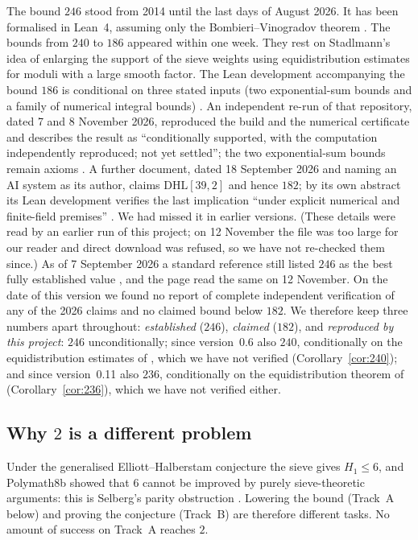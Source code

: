 \documentclass[11pt]{amsart}
\theoremstyle{definition}
\theoremstyle{remark}
\newcommand{\DHL}{\mathrm{DHL}}
\begin{document}
The bound $246$ stood from 2014 until the last days of August 2026. It has been
formalised in Lean~4, assuming only the Bombieri--Vinogradov theorem
\cite{Axiom26}. The bounds from $240$ to $186$ appeared within one week.
They rest on Stadlmann's idea of enlarging the support of the sieve weights
using equidistribution estimates for moduli with a large smooth factor. The
Lean development accompanying the bound $186$ is conditional on three stated
inputs (two exponential-sum bounds and a family of numerical integral bounds)
\cite{OAI26}. An independent re-run of that repository, dated 7 and 8 November
2026, reproduced the build and the numerical certificate and describes the
result as ``conditionally supported, with the computation independently
reproduced; not yet settled''; the two exponential-sum bounds remain axioms
\cite{NM26}. A further document, dated 18 September 2026 and naming an AI
system as its author, claims $\DHL[39,2]$ and hence $182$; by its own abstract
its Lean development verifies the last implication ``under explicit numerical
and finite-field premises'' \cite{Sha26}. We had missed it in earlier
versions. (These details were read by an earlier run of this project; on
12 November the file was too large for our reader and direct download was
refused, so we have not re-checked them since.) As of 7 September 2026 a standard reference still listed $246$ as
the best fully established value \cite{MW}, and the page read the same on 12
November. On the date of this version we found no report of complete
independent verification of any of the 2026 claims and no claimed bound below
$182$. We therefore keep three numbers apart throughout: \emph{established}
($246$), \emph{claimed} ($182$), and \emph{reproduced by this project}:
$246$ unconditionally; since version~0.6 also $240$, conditionally on
the equidistribution estimates of \cite{Sta26}, which we have not verified
(Corollary~\ref{cor:240}); and since version~0.11 also $236$, conditionally
on the equidistribution theorem of \cite{SY26} (Corollary~\ref{cor:236}),
which we have not verified either.

\subsection*{Why \texorpdfstring{$2$}{2} is a different problem}
Under the generalised Elliott--Halberstam conjecture the sieve gives $H_1\le6$,
and Polymath8b showed that $6$ cannot be improved by purely sieve-theoretic
arguments: this is Selberg's parity obstruction \cite{Pol14b}. Lowering the
bound (Track~A below) and proving the conjecture (Track~B) are therefore
different tasks. No amount of success on Track~A reaches $2$.
\end{document}
